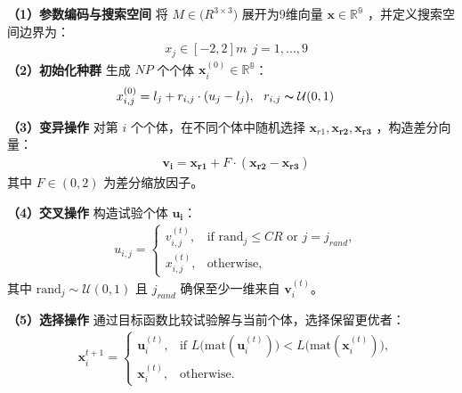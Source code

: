 \noindent\textbf{（1）参数编码与搜索空间}
将 $M\in \mathbb(R^{3\times 3})$ 展开为9维向量 $\mathbf{x}\in \mathbb{R^{9}}$ ，并定义搜索空间边界为：
\begin{equation}
\begin{aligned}
  &x_{j}\in [-2,2]m\ \ j=1,...,9
\end{aligned}
\end{equation}
\noindent\textbf{（2）初始化种群}
生成 $NP$ 个个体 $\mathbf{x}_{i}^{(0)}\in \mathbb{R^{9}}$：
\begin{equation}
\begin{aligned}
  &x^{(0)}_{i,j}=l_{j}+r_{i,j}\cdot (u_{j}-l_{j}),\ \ r_{i,j}\thicksim \mathcal{U}(0,1)
\end{aligned}
\end{equation}

\noindent\textbf{（3）变异操作}
对第 $i$ 个个体，在不同个体中随机选择 $\mathbf{x}_{r1},\mathbf{x_{r2}},\mathbf{x_{r3}}$ ，构造差分向量：
\begin{equation}
\begin{aligned}
  &\mathbf{v_{i}}=\mathbf{x_{r1}}+F\cdot (\mathbf{x_{r2}}-\mathbf{x_{r3}})
\end{aligned}
\end{equation}
其中 $F\in (0,2)$ 为差分缩放因子。

\noindent\textbf{（4）交叉操作}
构造试验个体 $\mathbf{u_{i}}$：
\begin{equation}
\begin{aligned}
  &u_{i,j}=
  \begin{cases}
    v_{i,j}^{(t)},&\text{if } \mathrm{rand}_j\le CR\text{ or } j=j_{rand},\\
    x_{i,j}^{(t)},&\text{otherwise},
  \end{cases}
\end{aligned}
\end{equation}
其中 $\mathrm{rand}_j\sim\mathcal{U}(0,1)$ 且 $j_{rand}$ 确保至少一维来自 $\mathbf{v}_i^{(t)}$。

\noindent\textbf{（5）选择操作}
通过目标函数比较试验解与当前个体，选择保留更优者：
\begin{equation}
\begin{aligned}
  &\mathbf{x}_{i}^{t+1}=
  \begin{cases}
    \mathbf{u}_i^{(t)},&\text{if } L\bigl(\mathrm{mat}(\mathbf{u}_i^{(t)})\bigr)<L\bigl(\mathrm{mat}(\mathbf{x}_i^{(t)})\bigr),\\
    \mathbf{x}_i^{(t)},&\text{otherwise}.
  \end{cases}
\end{aligned}
\end{equation}

